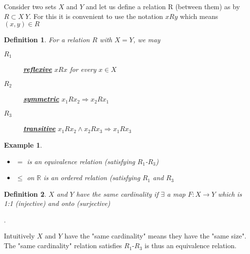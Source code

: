 \documentclass[12pt,letterpaper]{article}
\newtheorem{mydef}{Definition}
\newtheorem{example}{Example}
\newcommand{\biu}[1]{\underline{\textbf{\textit{#1}}}}
\newcommand{\so}{\Rightarrow}
\begin{document}
Consider two sets $X$ and $Y$ and let us define a relation R (between them) as by $R \subset X \ Y$. For this it is convenient to use the notation $xRy$ which means $(x,y)\in R$

\begin{mydef}
For a relation $R$ with $X=Y$, we may
\begin{description}
  	\item[$R_1$] \biu{reflexive} $xRx$ for every $x\in X$
    \item[$R_2$] \biu{symmetric} $x_1Rx_2\so x_2Rx_1 $
	\item[$R_3$] \biu{transitive}  $x_1Rx_2 \land x_2Rx_3 \so x_1Rx_3$
\end{description}
\end{mydef}

\begin{example}
\begin{itemize}
\item $=$ is an equivalence relation (satisfying $R_1$-$R_3$)
\item $\leq$ on $\mathbb{R}$ is an ordered relation (satisfying $R_1$ and $R_3$
\end{itemize}
\end{example}

\begin{mydef} $X$ and $Y$ have the same cardinality if $\exists$ a map $F: X\to Y$ which is 1:1 (injective) and onto (surjective)
\end{mydef}.

Intuitively $X$ and $Y$ have the "same cardinality" means they have the "same size".
The "same cardinality" relation satisfies $R_1$-$R_3$ is thus an equivalence relation. 
\end{document}
